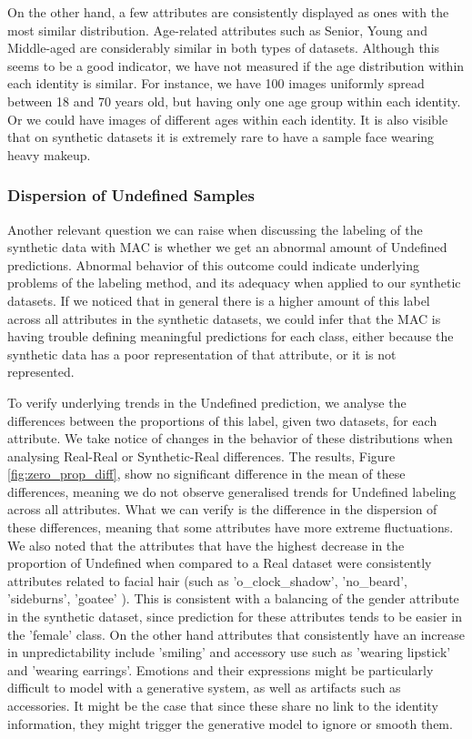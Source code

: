 \documentclass[a4paper, 10pt, conference]{ieeeconf}      %
\begin{document}
On the other hand, a few attributes are consistently displayed as ones with the most similar distribution. Age-related attributes such as Senior, Young and Middle-aged are considerably similar in both types of datasets. Although this seems to be a good indicator, we have not measured if the age distribution within each identity is similar. For instance, we have 100 images uniformly spread between 18 and 70 years old, but having only one age group within each identity. Or we could have images of different ages within each identity. It is also visible that on synthetic datasets it is extremely rare to have a sample face wearing heavy makeup. 



\subsubsection{Dispersion of Undefined Samples}

Another relevant question we can raise when discussing the labeling of the synthetic data with MAC is whether we get an abnormal amount of Undefined predictions. Abnormal behavior of this outcome could indicate underlying problems of the labeling method, and its adequacy when applied to our synthetic datasets. If we noticed that in general there is a higher amount of this label across all attributes in the synthetic datasets, we could infer that the MAC is having trouble defining meaningful predictions for each class, either because the synthetic data has a poor representation of that attribute, or it is not represented.  

To verify underlying trends in the Undefined prediction, we analyse the differences between the proportions of this label, given two datasets, for each attribute. We take notice of changes in the behavior of these distributions when analysing Real-Real or Synthetic-Real differences. The results, Figure \ref{fig:zero_prop_diff}, show no significant difference in the mean of these differences, meaning we do not observe generalised trends for Undefined labeling across all attributes. What we can verify is the difference in the dispersion of these differences, meaning that some attributes have more extreme fluctuations. We also noted that the attributes that have the highest decrease in the proportion of Undefined when compared to a Real dataset were consistently attributes related to facial hair (such as 'o\_clock\_shadow', 'no\_beard', 'sideburns', 'goatee' ). This is consistent with a balancing of the gender attribute in the synthetic dataset, since prediction for these attributes tends to be easier in the 'female' class.   On the other hand attributes that consistently have an increase in unpredictability include 'smiling' and accessory use such as 'wearing lipstick' and 'wearing earrings'. Emotions and their expressions might be particularly difficult to model with a generative system, as well as artifacts such as accessories. It might be the case that since these share no link to the identity information, they might trigger the generative model to ignore or smooth them.
\end{document}
